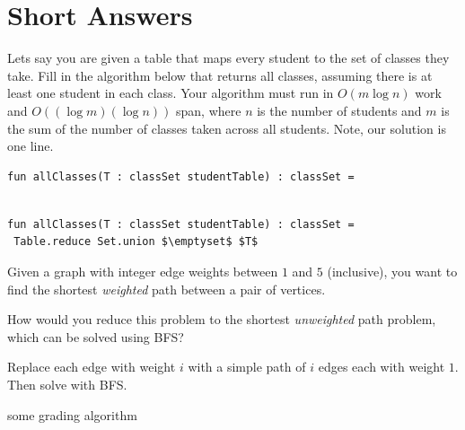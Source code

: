 \section{Short Answers}

%

\begin{problem}[20.][Classes]

Lets say you are given a table that maps every student to the set of
classes they take.  
Fill in the algorithm below that returns all classes,
assuming there is at least one student in each class.  Your algorithm
must run in $O(m \log n)$ work and $O((\log m)(\log n))$ span, where
$n$ is the number of students and $m$ is the sum of the number of
classes taken across all students.    Note, our solution is one line.

\ask

\begin{lstlisting}[numbers=none]
fun allClasses(T : classSet studentTable) : classSet = 


\end{lstlisting}


\sol
\begin{lstlisting}[numbers=none]
fun allClasses(T : classSet studentTable) : classSet = 
 Table.reduce Set.union $\emptyset$ $T$
\end{lstlisting}

\end{problem}

%

\begin{problem}

Given a graph with integer edge weights between $1$ and $5$
(inclusive), you want to find the shortest \emph{weighted} path
between a pair of vertices. 

\ask
How would you reduce this problem to the
shortest \emph{unweighted} path problem, which can be solved using
BFS?

\sol
Replace each edge with weight $i$ with a simple path of $i$ edges
each with weight $1$. Then solve with BFS.

\algo

\algog
some grading algorithm


\end{problem}

